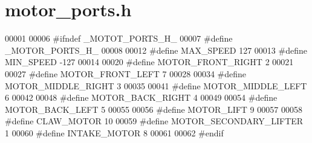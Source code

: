 \section{motor\+\_\+ports.\+h}
\label{motor__ports_8h_source}

\begin{DoxyCode}
00001 
00006 \textcolor{preprocessor}{#ifndef \_MOTOT\_PORTS\_H\_}
00007 \textcolor{preprocessor}{#define \_MOTOR\_PORTS\_H\_}
00008 
00012 \textcolor{preprocessor}{#define MAX\_SPEED 127}
00013 \textcolor{preprocessor}{#define MIN\_SPEED -127}
00014 
00020 \textcolor{preprocessor}{#define MOTOR\_FRONT\_RIGHT 2}
00021 
00027 \textcolor{preprocessor}{#define MOTOR\_FRONT\_LEFT 7}
00028 
00034 \textcolor{preprocessor}{#define MOTOR\_MIDDLE\_RIGHT 3}
00035 
00041 \textcolor{preprocessor}{#define MOTOR\_MIDDLE\_LEFT 6}
00042 
00048 \textcolor{preprocessor}{#define MOTOR\_BACK\_RIGHT 4}
00049 
00054 \textcolor{preprocessor}{#define MOTOR\_BACK\_LEFT 5}
00055 
00056 \textcolor{preprocessor}{#define MOTOR\_LIFT 9}
00057 
00058 \textcolor{preprocessor}{#define CLAW\_MOTOR 10}
00059 \textcolor{preprocessor}{#define MOTOR\_SECONDARY\_LIFTER 1}
00060 \textcolor{preprocessor}{#define INTAKE\_MOTOR 8}
00061 
00062 \textcolor{preprocessor}{#endif}
\end{DoxyCode}
